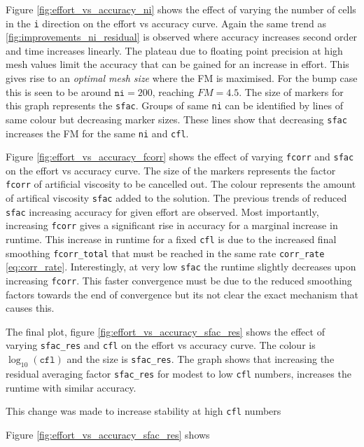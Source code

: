 \documentclass{article}
\begin{document}
Figure \ref{fig:effort_vs_accuracy_ni} shows the effect of varying the number of cells in the \texttt{i} direction on the effort vs accuracy curve.
Again the same trend as \ref{fig:improvements_ni_residual} is observed where accuracy increases second order and time increases linearly.
The plateau due to floating point precision at high mesh values limit the accuracy that can be gained for an increase in effort.
This gives rise to an \textit{optimal mesh size} where the FM is maximised.
For the bump case this is seen to be around $\texttt{ni}=200$, reaching $FM =4.5$.
The size of markers for this graph represents the \texttt{sfac}.
Groups of same \texttt{ni} can be identified by lines of same colour but decreasing marker sizes.
These lines show that decreasing \texttt{sfac} increases the FM for the same \texttt{ni} and \texttt{cfl}.

Figure \ref{fig:effort_vs_accuracy_fcorr} shows the effect of varying \texttt{fcorr} and \texttt{sfac} on the effort vs accuracy curve.
The size of the markers represents the factor \texttt{fcorr} of artificial viscosity to be cancelled out.
The colour represents the amount of artifical viscosity \texttt{sfac} added to the solution.
The previous trends of reduced \texttt{sfac} increasing accuracy for given effort are observed.
Most importantly, increasing \texttt{fcorr} gives a significant rise in accuracy for a marginal increase in runtime.
This increase in runtime for a fixed \texttt{cfl} is due to the increased final smoothing \texttt{fcorr\_total} that must be reached in the same rate \texttt{corr\_rate} \ref{eq:corr_rate}.
Interestingly, at very low \texttt{sfac} the runtime slightly decreases upon increasing \texttt{fcorr}.
This faster convergence must be due to the reduced smoothing factors towards the end of convergence but its not clear the exact mechanism that causes this.

The final plot, figure \ref{fig:effort_vs_accuracy_sfac_res} shows the effect of varying \texttt{sfac\_res} and \texttt{cfl} on the effort vs accuracy curve.
The colour is $\log_{10}(\texttt{cfl})$ and the size is \texttt{sfac\_res}.
The graph shows that increasing the residual averaging factor \texttt{sfac\_res} for modest to low \texttt{cfl} numbers, increases the runtime with similar accuracy.


This change was made to increase stability at high \texttt{cfl} numbers %

Figure \ref{fig:effort_vs_accuracy_sfac_res} shows 
\end{document}

